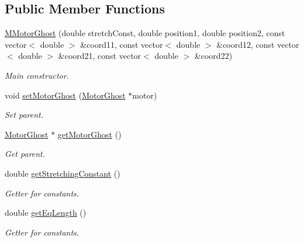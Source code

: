 \subsection*{Public Member Functions}
\begin{DoxyCompactItemize}
\item 
\hyperlink{classMMotorGhost_aa237f4dc8f2ec13841a2e348f2ca2016}{M\+Motor\+Ghost} (double stretch\+Const, double position1, double position2, const vector$<$ double $>$ \&coord11, const vector$<$ double $>$ \&coord12, const vector$<$ double $>$ \&coord21, const vector$<$ double $>$ \&coord22)
\begin{DoxyCompactList}\small\item\em Main constructor. \end{DoxyCompactList}\item 
void \hyperlink{classMMotorGhost_a629db9174d4bca0f43001f97fc37bea9}{set\+Motor\+Ghost} (\hyperlink{classMotorGhost}{Motor\+Ghost} $\ast$motor)
\begin{DoxyCompactList}\small\item\em Set parent. \end{DoxyCompactList}\item 
\hyperlink{classMotorGhost}{Motor\+Ghost} $\ast$ \hyperlink{classMMotorGhost_aa46956e65d843ae582530b80496cdc8f}{get\+Motor\+Ghost} ()
\begin{DoxyCompactList}\small\item\em Get parent. \end{DoxyCompactList}\end{DoxyCompactItemize}
{\bf }\par
\begin{DoxyCompactItemize}
\item 
double \hyperlink{classMMotorGhost_a67162e36027017554b7fe3bdc8bbf9c5}{get\+Stretching\+Constant} ()
\begin{DoxyCompactList}\small\item\em Getter for constants. \end{DoxyCompactList}\item 
double \hyperlink{classMMotorGhost_a49dd97a87f833f5815c0e6d152f78baa}{get\+Eq\+Length} ()
\begin{DoxyCompactList}\small\item\em Getter for constants. \end{DoxyCompactList}\end{DoxyCompactItemize}

